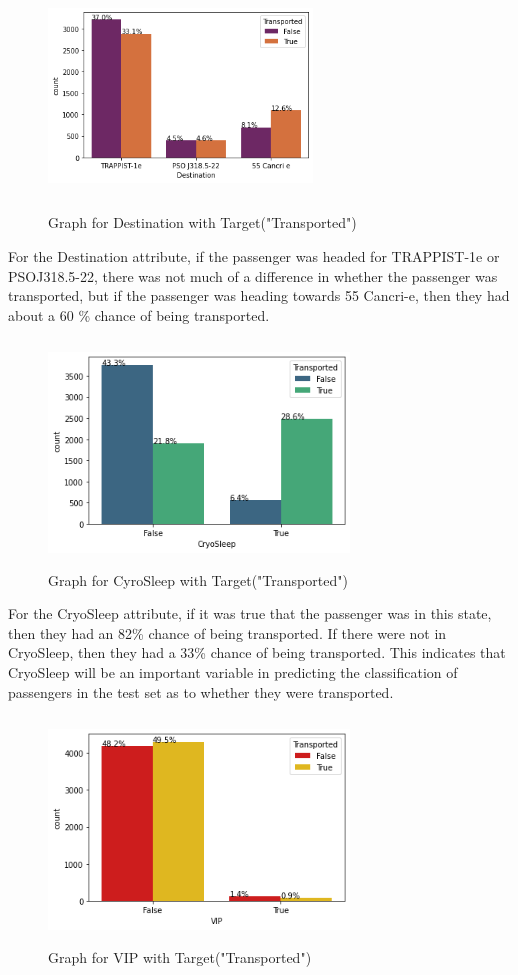 \documentclass[fleqn,10pt]{SelfArx} %
\begin{document}
\begin{figure}[H]
    \centering
    \includegraphics[width=7cm, height=6cm]{img/destination.png}
    \caption{Graph for Destination with Target("Transported")}
    \label{fig:my_label}
\end{figure}
For the Destination attribute, if the passenger was headed for TRAPPIST-1e or PSOJ318.5-22, there was not much of a difference in whether the passenger was transported, but if the passenger was heading towards 55 Cancri-e, then they had about a 60 \% chance of being transported. 
\begin{figure}[H]
    \centering
    \includegraphics[width=8cm, height=6cm]{img/crysleepaftermissingcover.png}
    \caption{Graph for CyroSleep with Target("Transported")}
    \label{fig:my_label}
\end{figure}    
For the CryoSleep attribute, if it was true that the passenger was in this state, then they had an 82\% chance of being transported. If there were not in CryoSleep, then they had a 33\% chance of being transported. This indicates that CryoSleep will be an important variable in predicting the classification of passengers in the test set as to whether they were transported. 
\begin{figure}[H]
    \centering
    \includegraphics[width=8cm, height=6cm]{img/vip.png}
    \caption{Graph for VIP with Target("Transported")}
    \label{fig:my_label}
\end{figure}  
\end{document}
